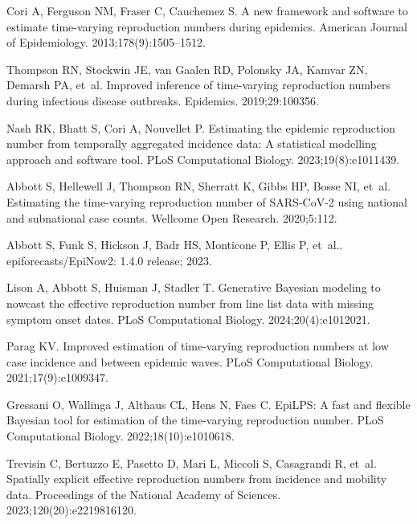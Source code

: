 \documentclass[10pt,letterpaper]{article}
\begin{document}
\begin{thebibliography}{10}
  Cori A, Ferguson NM, Fraser C, Cauchemez S.
  \newblock A new framework and software to estimate time-varying reproduction
    numbers during epidemics.
  \newblock American Journal of Epidemiology. 2013;178(9):1505--1512.
  
  Thompson RN, Stockwin JE, van Gaalen RD, Polonsky JA, Kamvar ZN, Demarsh PA,
    et~al.
  \newblock Improved inference of time-varying reproduction numbers during
    infectious disease outbreaks.
  \newblock Epidemics. 2019;29:100356.
  
  Nash RK, Bhatt S, Cori A, Nouvellet P.
  \newblock Estimating the epidemic reproduction number from temporally
    aggregated incidence data: A statistical modelling approach and software
    tool.
  \newblock PLoS Computational Biology. 2023;19(8):e1011439.
  
  Abbott S, Hellewell J, Thompson RN, Sherratt K, Gibbs HP, Bosse NI, et~al.
  \newblock Estimating the time-varying reproduction number of {SARS-CoV-2} using
    national and subnational case counts.
  \newblock Wellcome Open Research. 2020;5:112.
  
  Abbott S, Funk S, Hickson J, Badr HS, Monticone P, Ellis P, et~al..
    epiforecasts/{EpiNow2}: 1.4.0 release; 2023.
  
  Lison A, Abbott S, Huisman J, Stadler T.
  \newblock Generative {B}ayesian modeling to nowcast the effective reproduction
    number from line list data with missing symptom onset dates.
  \newblock PLoS Computational Biology. 2024;20(4):e1012021.
  
  Parag KV.
  \newblock Improved estimation of time-varying reproduction numbers at low case
    incidence and between epidemic waves.
  \newblock PLoS Computational Biology. 2021;17(9):e1009347.
  
  Gressani O, Wallinga J, Althaus CL, Hens N, Faes C.
  \newblock EpiLPS: A fast and flexible {B}ayesian tool for estimation of the
    time-varying reproduction number.
  \newblock PLoS Computational Biology. 2022;18(10):e1010618.
  
  Trevisin C, Bertuzzo E, Pasetto D, Mari L, Miccoli S, Casagrandi R, et~al.
  \newblock Spatially explicit effective reproduction numbers from incidence and
    mobility data.
  \newblock Proceedings of the National Academy of Sciences.
    2023;120(20):e2219816120.
  

\end{thebibliography}
\end{document}
